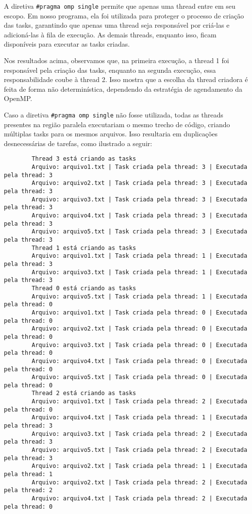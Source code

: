 \documentclass[a4paper, 12pt]{article}
\begin{document}
	A diretiva \texttt{\#pragma omp single} permite que apenas uma thread entre em seu escopo. Em nosso programa, ela foi utilizada para proteger o processo de criação das tasks, garantindo que apenas uma thread seja responsável por criá-las e adicioná-las à fila de execução. As demais threads, enquanto isso, ficam disponíveis para executar as tasks criadas.
	
	Nos resultados acima, observamos que, na primeira execução, a thread 1 foi responsável pela criação das tasks, enquanto na segunda execução, essa responsabilidade coube à thread 2. Isso mostra que a escolha da thread criadora é feita de forma não determinística, dependendo da estratégia de agendamento da OpenMP.
	
	Caso a diretiva \texttt{\#pragma omp single} não fosse utilizada, todas as threads presentes na região paralela executariam o mesmo trecho de código, criando múltiplas tasks para os mesmos arquivos. Isso resultaria em duplicações desnecessárias de tarefas, como ilustrado a seguir:
	
	\begin{verbatim}
		Thread 3 está criando as tasks
		Arquivo: arquivo1.txt | Task criada pela thread: 3 | Executada pela thread: 3
		Arquivo: arquivo2.txt | Task criada pela thread: 3 | Executada pela thread: 3
		Arquivo: arquivo3.txt | Task criada pela thread: 3 | Executada pela thread: 3
		Arquivo: arquivo4.txt | Task criada pela thread: 3 | Executada pela thread: 3
		Arquivo: arquivo5.txt | Task criada pela thread: 3 | Executada pela thread: 3
		Thread 1 está criando as tasks
		Arquivo: arquivo1.txt | Task criada pela thread: 1 | Executada pela thread: 3
		Arquivo: arquivo3.txt | Task criada pela thread: 1 | Executada pela thread: 3
		Thread 0 está criando as tasks
		Arquivo: arquivo5.txt | Task criada pela thread: 1 | Executada pela thread: 0
		Arquivo: arquivo1.txt | Task criada pela thread: 0 | Executada pela thread: 0
		Arquivo: arquivo2.txt | Task criada pela thread: 0 | Executada pela thread: 0
		Arquivo: arquivo3.txt | Task criada pela thread: 0 | Executada pela thread: 0
		Arquivo: arquivo4.txt | Task criada pela thread: 0 | Executada pela thread: 0
		Arquivo: arquivo5.txt | Task criada pela thread: 0 | Executada pela thread: 0
		Thread 2 está criando as tasks
		Arquivo: arquivo1.txt | Task criada pela thread: 2 | Executada pela thread: 0
		Arquivo: arquivo4.txt | Task criada pela thread: 1 | Executada pela thread: 3
		Arquivo: arquivo3.txt | Task criada pela thread: 2 | Executada pela thread: 3
		Arquivo: arquivo5.txt | Task criada pela thread: 2 | Executada pela thread: 3
		Arquivo: arquivo2.txt | Task criada pela thread: 1 | Executada pela thread: 1
		Arquivo: arquivo2.txt | Task criada pela thread: 2 | Executada pela thread: 2
		Arquivo: arquivo4.txt | Task criada pela thread: 2 | Executada pela thread: 0
	\end{verbatim}
	
\end{document}

